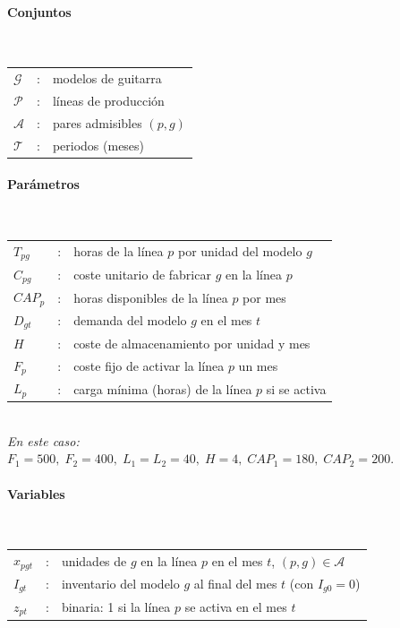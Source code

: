 \paragraph{Conjuntos}\mbox{}\\
\begin{tabular}{l c l}
    $\mathcal{G}$  & : & modelos de guitarra \\
    $\mathcal{P}$  & : & líneas de producción \\
    $\mathcal{A}$  & : & pares admisibles $(p,g)$ \\
    $\mathcal{T}$  & : & periodos (meses) \\
\end{tabular}

\paragraph{Parámetros}\mbox{}\\
\begin{tabular}{l c l}
    $T_{pg}$   & : & horas de la línea $p$ por unidad del modelo $g$ \\
    $C_{pg}$   & : & coste unitario de fabricar $g$ en la línea $p$ \\
    $CAP_p$    & : & horas disponibles de la línea $p$ por mes \\
    $D_{gt}$   & : & demanda del modelo $g$ en el mes $t$ \\
    $H$        & : & coste de almacenamiento por unidad y mes \\
    $F_p$      & : & coste fijo de activar la línea $p$ un mes \\
    $L_p$      & : & carga mínima (horas) de la línea $p$ si se activa \\
\end{tabular}
\\[2pt]
\textit{En este caso: } $F_1=500,\; F_2=400,\; L_1=L_2=40,\; H=4,\; CAP_1=180,\; CAP_2=200.$

\paragraph{Variables}\mbox{}\\
\begin{tabular}{l c l}
    $x_{pgt}$ & : & unidades de $g$ en la línea $p$ en el mes $t$, \; $(p,g)\in\mathcal{A}$ \\
    $I_{gt}$    & : & inventario del modelo $g$ al final del mes $t$ (con $I_{g0}=0$) \\
    $z_{pt}$    & : & binaria: 1 si la línea $p$ se activa en el mes $t$ \\
\end{tabular}

